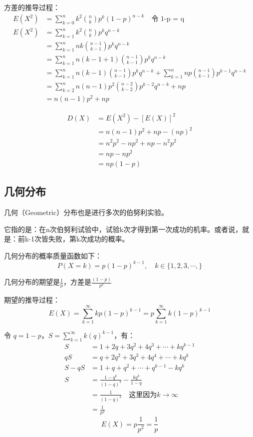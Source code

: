 \documentclass[12pt]{article}
\begin{document}
方差的推导过程：
\begin{align}
    E(X^2) &= \sum_{k=0}^n k^2\binom{n}{k}p^k(1-p)^{n-k}  \quad \text{令 1-p = q}\\
    E(X^2) &= \sum_{k=1}^n k^2\binom{n}{k}p^kq^{n-k} \\
    &= \sum_{k=1}^n nk\binom{n-1}{k-1}p^kq^{n-k} \\
    &= \sum_{k=1}^n n(k-1+1)\binom{n-1}{k-1}p^kq^{n-k} \\
    &= \sum_{k=1}^n n(k-1)\binom{n-1}{k-1}p^kq^{n-k} + \sum_{k=1}^n np\binom{n-1}{k-1}p^{k-1}q^{n-k} \\
    &= \sum_{k=2}^n n(n-1)p^2\binom{n-2}{k-2}p^{k-2}q^{n-k} + np \\
    &= n(n-1)p^2 + np
\end{align}

\begin{align}
    D(X) &= E(X^2) - [E(X)]^2 \\
         &= n(n-1)p^2 + np - (np)^2 \\
         &= n^2p^2 - np^2 + np - n^2p^2\\
         &= np - np^2 \\
         &= np(1-p)
\end{align}


\subsection{几何分布}
几何（Geometric）分布也是进行多次的伯努利实验。

它指的是：在n次伯努利试验中，试验k次才得到第一次成功的机率。或者说，就是：前k-1次皆失败，第k次成功的概率。

几何分布的概率质量函数如下：
$$
P(X = k) = p(1-p)^{k - 1}, \quad k \in \{1, 2, 3, \cdots, \}
$$

几何分布的期望是$\frac{1}{p}$，方差是$\frac{(1-p)}{p^2}$

期望的推导过程：
$$
E(X) = \sum_{k=1}^{\infty}kp(1-p)^{k-1} = p\sum_{k=1}^{\infty}k(1-p)^{k-1}
$$

令 $q = 1 - p$，$S = \sum_{k=1}^{\infty}k(q)^{k-1}$，有：
\begin{align}
    S &= 1 + 2q + 3q^2 + 4q^3 + \cdots + kq^{k-1}\\
   qS &= q + 2q^2 + 3q^3 + 4q^4 + \cdots + kq^{k}\\
   S - qS &= 1 + q + q^2 + \cdots + q^{k-1} - kq^k \\
   S &= \frac{1-q^k}{(1-q)^2} - \frac{kq^k}{1-q} \\
     &= \frac{1}{(1-q)^2} \quad \text{这里因为} k \rightarrow \infty \\
     &= \frac{1}{p^2}
\end{align}
$$
E(X) = p\frac{1}{p^2} = \frac{1}{p}
$$
\end{document}
